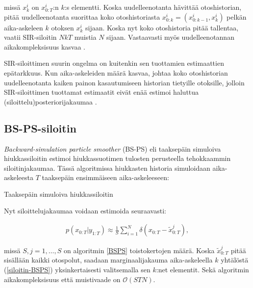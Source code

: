 \documentclass[
  12pt,
  a4paper, twoside]{book}
\begin{document}
\noindent missä \(x^i_k\) on \(x^i_{0:T}\):n \(k\):s elementti. Koska uudelleenotanta hävittää otoshistorian, pitää uudelleenotanta suorittaa koko otoshistoriasta \(x_{0:k}^i = (x_{0:k-1}^i, x_{k}^i)\) pelkän aika-askeleen \(k\) otoksen \(x_{k}^i\) sijaan. Koska nyt koko otoshistoria pitää tallentaa, vaatii SIR-siloitin \(NkT\) muistia \(N\) sijaan. Vastaavasti myös uudelleenotannan aikakompleksisuus kasvaa \citep{kitagawa-1996}.

SIR-siloittimen suurin ongelma on kuitenkin sen tuottamien estimaattien epätarkkuus. Kun aika-askeleiden määrä kasvaa, johtaa koko otoshistorian uudelleenotanta kaiken painon kasautumiseen historian tietyille otoksille, jolloin SIR-siloittimen tuottamat estimaatit eivät enää estimoi haluttua (siloittelu)posteriorijakaumaa \citep{kitagawa-1996}.

\subsection{BS-PS-siloitin}

\emph{Backward-simulation particle smoother} (BS-PS) eli taaksepäin simuloiva hiukkassiloitin estimoi hiukkassuotimen tulosten perusteella tehokkaammin siloitinjakaumaa. Tässä algoritmissa hiukkasten historia simuloidaan aika-askeleesta \(T\) taaksepäin ensimmäiseen aika-askeleeseen:

\begin{algorithm}[H]
\label{BSPS}
\DontPrintSemicolon
\SetAlgoShortEnd
{}
\caption{Taaksepäin simuloiva hiukkassiloitin}
\end{algorithm}

Nyt siloittelujakaumaa voidaan estimoida seuraavasti:

\begin{align}\label{siloitin-BSPS}
p(x_{0:T}|y_{1:T}) \approx \frac{1}{S} \sum_{i=1}^N \delta (x_{0:T}-\tilde{x}_{0:T}^j),
\end{align}

\noindent missä \(S, j=1,\ldots,S\) on algoritmin \ref{BSPS} toistokertojen määrä. Koska \(\tilde{x}_{0:T}^j\) pitää sisällään kaikki otospolut, saadaan marginaalijakauma aika-askeleella \(k\) yhtälöstä (\ref{siloitin-BSPS}) yksinkertaisesti valitsemalla sen \(k\):net elementit. Sekä algoritmin aikakompleksisuus että muistivaade on \(\mathcal{O}(STN)\).
\end{document}
